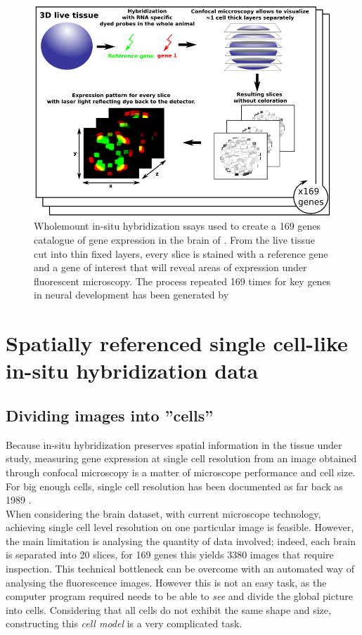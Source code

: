     \begin{figure}[bth]
\centerline{\includegraphics[width=1.3\linewidth]{gfx/chapter1/insitu.png}}
\caption{Wholemount in-situ hybridization ssays used to create a 169 genes catalogue of gene expression in the brain of \platy{}. From the live tissue cut into thin fixed layers, every slice is stained with a reference gene and a gene of interest that will reveal areas of expression under fluorescent microscopy. The process repeated 169 times for key genes in \platy{} neural development has been generated by \citep{Tomer10}}\label{fig:insitu}
	\end{figure}
	

\section{Spatially referenced single cell-like in-situ hybridization data}\label{sec:single_cell_insitu}
  \subsection{Dividing images into ''cells''}
  Because in-situ hybridization preserves spatial information in the tissue under study, measuring gene expression at single cell resolution from an image obtained through confocal microscopy is a matter of microscope performance and cell size. For big enough cells, single cell resolution has been documented as far back as 1989 \citep{tautz89,poulsen93}.\\
  
  When considering the \platy{} brain dataset, with current microscope technology, achieving single cell level resolution on one particular image is feasible. However, the main limitation is analysing the quantity of data involved; indeed, each brain is separated into 20 slices, for 169 genes this yields 3380 images that require inspection. This technical bottleneck can be overcome with an automated way of analysing the fluorescence images. However this is not an easy task, as the computer program required needs to be able to \emph{see} and divide the global picture into cells. Considering that all cells do not exhibit the same shape and size, constructing this \emph{cell model} is a very complicated task.\\
  
